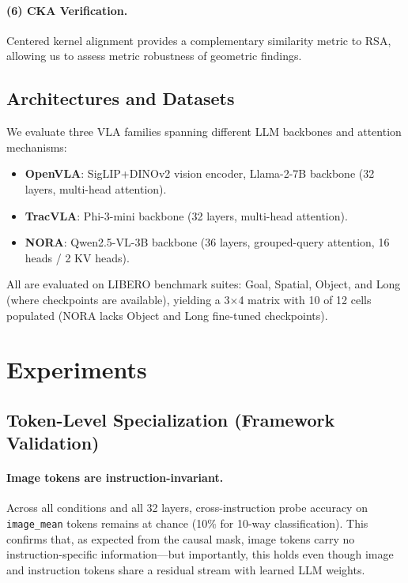 \documentclass[letterpaper]{article}
\begin{document}
\paragraph{(6) CKA Verification.}
Centered kernel alignment provides a complementary similarity metric to RSA, allowing us to assess metric robustness of geometric findings.

\subsection{Architectures and Datasets}
We evaluate three VLA families spanning different LLM backbones and attention mechanisms:

\begin{itemize}
  \item \textbf{OpenVLA}: SigLIP+DINOv2 vision encoder, Llama-2-7B backbone (32 layers, multi-head attention).
  \item \textbf{TracVLA}: Phi-3-mini backbone (32 layers, multi-head attention).
  \item \textbf{NORA}: Qwen2.5-VL-3B backbone (36 layers, grouped-query attention, 16 heads / 2 KV heads).
\end{itemize}

All are evaluated on LIBERO benchmark suites: Goal, Spatial, Object, and Long (where checkpoints are available), yielding a 3$\times$4 matrix with 10 of 12 cells populated (NORA lacks Object and Long fine-tuned checkpoints).

\section{Experiments}
\label{sec:experiments}

\subsection{Token-Level Specialization (Framework Validation)}
\label{sec:exp-specialization}

\paragraph{Image tokens are instruction-invariant.}
Across all conditions and all 32 layers, cross-instruction probe accuracy on \texttt{image\_mean} tokens remains at chance (10\% for 10-way classification).
This confirms that, as expected from the causal mask, image tokens carry no instruction-specific information---but importantly, this holds even though image and instruction tokens share a residual stream with learned LLM weights.
\end{document}
